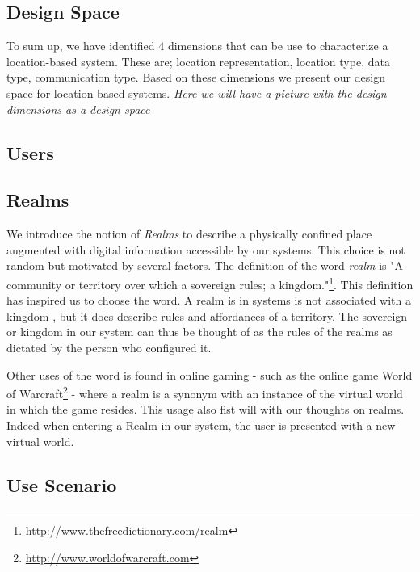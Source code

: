 

\subsection{Design Space} %
\label{sub:design_space}
To sum up, we have identified 4 dimensions that can be use to characterize a location-based system. These are; location representation, location type, data type, communication type. Based on these dimensions we present our design space for location based systems.  \emph{Here we will have a picture with the design dimensions as a design space}


\subsection{Users} %
\label{sub:users}



\subsection{Realms} %
\label{sub:realms}
We introduce the notion of \emph{Realms} to describe a physically confined place augmented with digital information accessible by our systems. This choice is not random but motivated by several factors. The definition of the word \emph{realm} is "A community or territory over which a sovereign rules; a kingdom."\footnote{\url{http://www.thefreedictionary.com/realm}}. This definition has inspired us to choose the word. A realm is in systems is not associated with a kingdom , but it does describe rules and affordances of a territory. The sovereign or kingdom in our system can thus be thought of as the rules of the realms as dictated by the person who configured it. 

Other uses of the word is found in online gaming - such as the online game World of Warcraft\footnote{\url{http://www.worldofwarcraft.com}} - where a realm is a synonym with an instance of the virtual world in which the game resides. This usage also fist will with our thoughts on realms. Indeed when entering a Realm in our system, the user is presented with a new virtual world.


\subsection{Use Scenario} %
\label{sub:}




